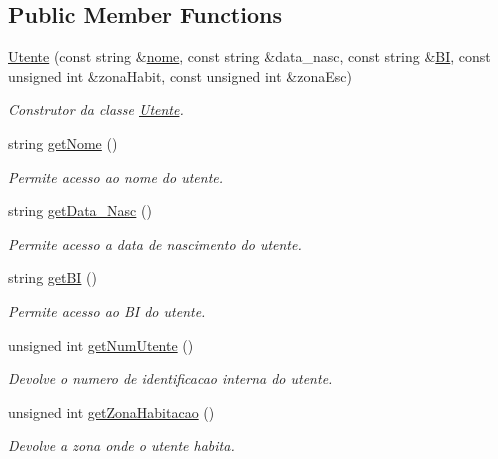 \subsection*{Public Member Functions}
\begin{DoxyCompactItemize}
\item 
\mbox{\hyperlink{class_utente_adf216e1f6792b96c6404aae73121d44d}{Utente}} (const string \&\mbox{\hyperlink{class_utente_a328c722d27759eaa88596ccb4cf2549f}{nome}}, const string \&data\+\_\+nasc, const string \&\mbox{\hyperlink{class_utente_ac5acf8e42ccd10808d077fc0db2e05f9}{BI}}, const unsigned int \&zona\+Habit, const unsigned int \&zona\+Esc)
\begin{DoxyCompactList}\small\item\em Construtor da classe \mbox{\hyperlink{class_utente}{Utente}}. \end{DoxyCompactList}\item 
string \mbox{\hyperlink{class_utente_a56bf08dbd5fb7fd208421cae1105d9e4}{get\+Nome}} ()
\begin{DoxyCompactList}\small\item\em Permite acesso ao nome do utente. \end{DoxyCompactList}\item 
string \mbox{\hyperlink{class_utente_a71bbb2b8ae7bc703c983601653b8bd0e}{get\+Data\+\_\+\+Nasc}} ()
\begin{DoxyCompactList}\small\item\em Permite acesso a data de nascimento do utente. \end{DoxyCompactList}\item 
string \mbox{\hyperlink{class_utente_a4f00a92ad23d9b42e799e90444f0b99f}{get\+BI}} ()
\begin{DoxyCompactList}\small\item\em Permite acesso ao BI do utente. \end{DoxyCompactList}\item 
unsigned int \mbox{\hyperlink{class_utente_a02e1b87d26c3770a70e01ecdc7cf87f2}{get\+Num\+Utente}} ()
\begin{DoxyCompactList}\small\item\em Devolve o numero de identificacao interna do utente. \end{DoxyCompactList}\item 
unsigned int \mbox{\hyperlink{class_utente_a69163220b163eeef2359745f9d7b92c2}{get\+Zona\+Habitacao}} ()
\begin{DoxyCompactList}\small\item\em Devolve a zona onde o utente habita. \end{DoxyCompactList}\item 

\end{DoxyCompactItemize}
